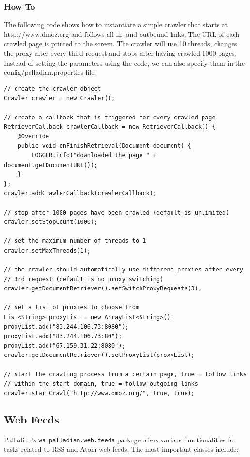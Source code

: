 \subsubsection{How To}
The following code shows how to instantiate a simple crawler that starts at http://www.dmoz.org and follows all in- and outbound links. The URL of each crawled page is printed to the screen. The crawler will use 10 threads, changes the proxy after every third request and stops after having crawled 1000 pages. Instead of setting the parameters using the code, we can also specify them in the config/palladian.properties file.

\begin{codelisting}
\begin{lstlisting}[caption=Using the web crawler.,frame=tb]
// create the crawler object
Crawler crawler = new Crawler();

// create a callback that is triggered for every crawled page
RetrieverCallback crawlerCallback = new RetrieverCallback() {
    @Override
    public void onFinishRetrieval(Document document) {
        LOGGER.info("downloaded the page " + document.getDocumentURI());
    }
};
crawler.addCrawlerCallback(crawlerCallback);

// stop after 1000 pages have been crawled (default is unlimited)
crawler.setStopCount(1000);

// set the maximum number of threads to 1
crawler.setMaxThreads(1);

// the crawler should automatically use different proxies after every
// 3rd request (default is no proxy switching)
crawler.getDocumentRetriever().setSwitchProxyRequests(3);

// set a list of proxies to choose from
List<String> proxyList = new ArrayList<String>();
proxyList.add("83.244.106.73:8080");
proxyList.add("83.244.106.73:80");
proxyList.add("67.159.31.22:8080");
crawler.getDocumentRetriever().setProxyList(proxyList);

// start the crawling process from a certain page, true = follow links
// within the start domain, true = follow outgoing links
crawler.startCrawl("http://www.dmoz.org/", true, true);
\end{lstlisting}
\end{codelisting}

\subsection{Web Feeds}
Palladian's \texttt{ws.palladian.web.feeds} package offers various functionalities for tasks related to RSS and Atom web feeds. The most important classes include:

